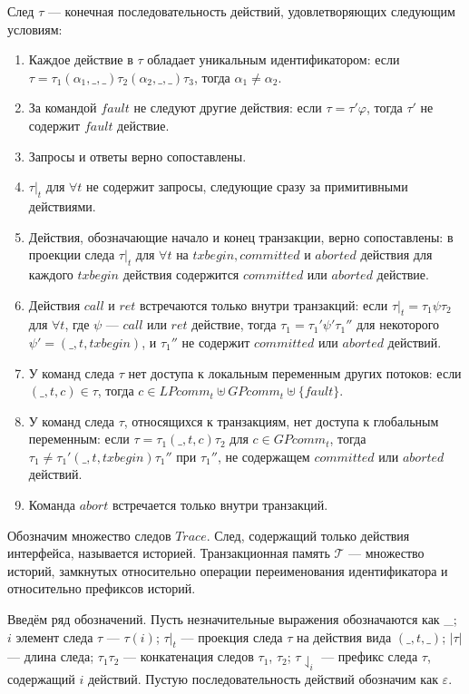 \begin{mydefinition}\label{def2} След $\tau$ --- конечная последовательность действий, удовлетворяющих следующим условиям:
\begin{enumerate}
  \item Каждое действие в $\tau$ обладает уникальным идентификатором: если $\tau = \tau_1 (\alpha_1,\_,\_) \tau_2 (\alpha_2,\_,\_) \tau_3$, тогда $\alpha_1 \neq \alpha_2$.   
  \item За командой $fault$ не следуют другие действия: если $\tau = \tau'\varphi$, тогда $\tau'$ не содержит $fault$ действие.
  \item Запросы и ответы верно сопоставлены.
  \item $\tau|_t$ для $\forall t$ не содержит запросы, следующие сразу за примитивными действиями.
  \item Действия, обозначающие начало и конец транзакции, верно сопоставлены: в проекции следа $\tau|_t$ для $\forall t$ на $txbegin, committed$ и $aborted$ действия для каждого $txbegin$ действия содержится $committed$ или $aborted$ действие.
  \item Действия $call$ и $ret$ встречаются только внутри транзакций: если $\tau|_t = \tau_1\psi\tau_2$ для $\forall t$, где $\psi$ --- $call$ или $ret$ действие, тогда $\tau_1 = \tau_1'\psi'\tau_1''$ для некоторого $\psi' = (\_,t,txbegin)$, и $\tau_1''$ не содержит $committed$ или $aborted$ действий.
  \item У команд следа $\tau$ нет доступа к локальным переменным других потоков: если $(\_,t,c) \in \tau$, тогда $c \in LPcomm_t \uplus GPcomm_t \uplus \{ fault\}$.
  \item У команд следа $\tau$, относящихся к транзакциям, нет доступа к глобальным переменным: если $\tau = \tau_1(\_,t,c)\tau_2$ для $c \in GPcomm_t$, тогда $\tau_1 \neq \tau_1'(\_,t,txbegin)\tau_1''$ при $\tau_1''$, не содержащем $committed$ или $aborted$ действий.
  \item Команда $abort$ встречается только внутри транзакций.
\end{enumerate}

\end{mydefinition}

Обозначим множество следов $Trace$. След, содержащий только действия интерфейса, называется историей. Транзакционная память $\mathcal{T}$ --- множество историй, замкнутых относительно операции переименования идентификатора и относительно префиксов историй.

Введём ряд обозначений. Пусть незначительные выражения обозначаются как \_; $i$ элемент следа $\tau$ --- $\tau(i)$; $\tau|_t$ --- проекция следа $\tau$ на действия вида $(\_,t,\_)$; $|\tau|$ --- длина следа; $\tau_1\tau_2$ --- конкатенация следов $\tau_1$, $\tau_2$; $\tau\downharpoonleft_i$ --- префикс следа $\tau$, содержащий $i$ действий. Пустую последовательность действий обозначим как $\varepsilon$.

